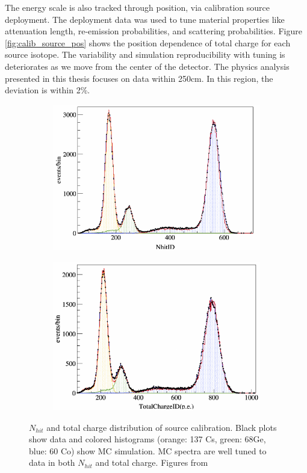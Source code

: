 The energy scale is also tracked through position, via calibration source deployment. The deployment data was used to tune material properties like attenuation length, re-emission probabilities, and scattering probabilities. Figure \ref{fig:calib_source_pos} shows the position dependence of total charge for each source isotope. The variability and simulation reproducibility with tuning is deteriorates as we move from the center of the detector. The physics analysis presented in this thesis focuses on data within 250cm. In this region, the deviation is within 2\%.
\begin{figure}[htb]
    \centering
    \begin{subfigure}[b]{0.48\textwidth}
        \centering
        \includegraphics[width=\textwidth]{calib_source_nhit.png}
    \end{subfigure}
    \hfill
    \begin{subfigure}[b]{0.48\textwidth}
        \centering
        \includegraphics[width=\textwidth]{calib_source_charge.png}
    \end{subfigure}
    
    \caption{$N_{hit}$ and total charge distribution of source calibration. Black plots show data and colored histograms (orange: 137 Cs, green: 68Ge, blue: 60 Co) show MC simulation. MC spectra are well tuned to data in both $N_{hit}$ and total charge. Figures from \cite{ozaki_phd}}
    \label{fig:calib_source}
\end{figure}

